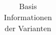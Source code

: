 \begin{table}[h!]
{\begin{tabular}{@{}p{5cm} p{2.5cm} p{2.5cm} p{2.5cm}@{}}
\end{tabular}
\caption{Basis Informationen der Varianten}
\label{tab:t-08-01-Varianten}
}
\end{table}


%


